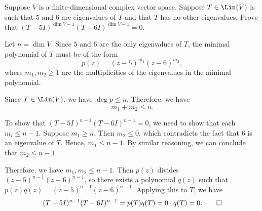 \begin{exercise}
Suppose $V$ is a finite-dimensional complex vector space. Suppose
$T\in\Lin(V)$ is such that $5$ and $6$ are eigenvalues of $T$ and that $T$ has
no other eigenvalues. Prove that $(T-5I)^{\dim V-1}(T-6I)^{\dim V-1}=0$.
\end{exercise}
\begin{solution}
Let $n=\dim V$. Since $5$ and $6$ are the only eigenvalues of $T$, the minimal
polynomial of $T$ must be of the form
\[ p(z)=(z-5)^{m_1}(z-6)^{m_2}, \]
where $m_1,m_2\ge1$ are the multiplicities of the eigenvalues in the minimal
polynomial.

Since $T\in\Lin(V)$, we have $\deg p\le n$. Therefore, we have
\[ m_1+m_2\le n. \]

To show that $(T-5I)^{n-1}(T-6I)^{n-1}=0$, we need to show that each
$m_i\le n-1$. Suppose $m_1\ge n$. Then $m_2\le0$, which contradicts the fact
that $6$ is an eigenvalue of $T$. Hence, $m_1\le n-1$. By similar reasoning,
we can conclude that $m_2\le n-1$.

Therefore, we have $m_1,m_2\le n-1$. Then $p(z)$ divides
$(z-5)^{n-1}(z-6)^{n-1}$, so there exists a polynomial $q(z)$ such that
$p(z)q(z)=(z-5)^{n-1}(z-6)^{n-1}$. Applying this to $T$, we have
\[ (T-5I)^{n-1}(T-6I)^{n-1}=p(T)q(T)=0\cdot q(T)=0. \qedhere \]
\end{solution}

